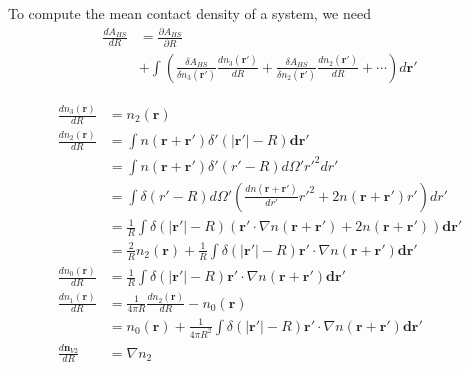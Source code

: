 \documentclass[letterpaper,twocolumn,amsmath,amssymb,prb]{revtex4-1}
\newcommand{\derivation}[1]{#1} %
\begin{document}
\derivation{

  To compute the mean contact density of a system, we need
  \begin{align}
    \frac{d A_{HS}}{d R} &=
    \frac{\partial A_{HS}}{\partial R} \\
    &+
    \int \left(
    \frac{\delta A_{HS}}{\delta n_3(\mathbf{r}')}
    \frac{d n_3(\mathbf{r}')}{d R}
    +
    \frac{\delta A_{HS}}{\delta n_2(\mathbf{r}')}
    \frac{d n_2(\mathbf{r}')}{d R}
    + \cdots
    \right) d\mathbf{r}'
  \end{align}

  \begin{align}
    \frac{dn_3(\mathbf{r})}{dR} &= n_2(\mathbf{r})\\
    \frac{dn_2(\mathbf{r})}{dR} &= \int n(\mathbf{r}+\mathbf{r}')
    \delta'(|\mathbf{r'}| - R)\mathbf{dr}'\\
    &= \int n(\mathbf{r}+\mathbf{r}')
    \delta'(r' - R) d\Omega' r'^2 dr'\\
    &= \int 
    \delta(r' - R) d\Omega' \left(\frac{dn(\mathbf{r}+\mathbf{r}')}{dr'}r'^2 + 2n(\mathbf{r}+\mathbf{r}')r' \right) dr'\\
    &= \frac1{R} \int 
    \delta(|\mathbf{r}'| - R)
    \left(\mathbf{r}'\cdot \nabla n(\mathbf{r}+\mathbf{r}') +
    2n(\mathbf{r}+\mathbf{r}') \right) \mathbf{dr}' \\
    &= \frac{2}{R}n_2(\mathbf{r}) + \frac{1}{R} \int 
    \delta(|\mathbf{r}'| - R)\mathbf{r}'\cdot \nabla n(\mathbf{r}+\mathbf{r}') \mathbf{dr}' \\
    \frac{dn_0(\mathbf{r})}{dR} &= \frac{1}{R} \int 
    \delta(|\mathbf{r}'| - R)\mathbf{r}'\cdot \nabla n(\mathbf{r}+\mathbf{r}') \mathbf{dr}' \\
    \frac{dn_1(\mathbf{r})}{dR} &=
    \frac1{4\pi R}\frac{dn_2(\mathbf{r})}{dR} - n_0(\mathbf{r}) \\
    &= n_0(\mathbf{r}) + \frac{1}{4\pi R^2} \int 
    \delta(|\mathbf{r}'| - R)\mathbf{r}'\cdot \nabla n(\mathbf{r}+\mathbf{r}') \mathbf{dr}' \\
    \frac{d\mathbf{n}_{V2}}{dR} &= \nabla n_2
  \end{align}
  
}
\end{document}
